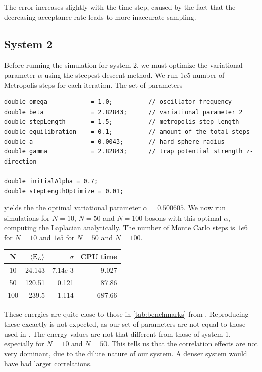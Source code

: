 \documentclass[english, a4paper]{article}
\begin{document}
\noindent The error increases slightly with the time step, caused by the fact
that the decreasing acceptance rate leads to more inaccurate sampling.  

\subsection{System 2}

Before running the simulation for system 2, we must optimize the variational parameter $\alpha$ using
the steepest descent method. We run $1e5$ number of Metropolis steps for each iteration.
The set of parameters
\belowcaptionskip=-10pt
\begin{lstlisting}[label=parameters3,caption=Parameters system 2]
double omega            = 1.0;          // oscillator frequency
double beta             = 2.82843;      // variational parameter 2
double stepLength       = 1.5;          // metropolis step length
double equilibration    = 0.1;          // amount of the total steps
double a                = 0.0043;       // hard sphere radius
double gamma            = 2.82843;      // trap potential strength z-direction

double initialAlpha = 0.7;
double stepLengthOptimize = 0.01;
\end{lstlisting}
yields the the optimal variational parameter $\alpha = 0.500605$. 
We now run simulations for $N=10$, $N=50$ and $N=100$ bosons with this optimal $\alpha$, computing
the Laplacian analytically. 
The number of Monte Carlo steps is $1e6$ for $N=10$ and $1e5$ for $N=50$ and $N=100$.
\begin{table}[H]
  \centering
  \begin{tabular}{ | c | r | r | r | }
    \hline
    N& $\langle {\textrm E_L}\rangle$& $\sigma$& CPU time \\*
    \hline
    10& 24.143& 7.14e-3& 9.027 \\*
    \hline
    50& 120.51& 0.121& 87.86  \\*
    \hline
    100& 239.5& 1.114& 687.66\\*
    \hline
  \end{tabular}
  \label{tab:Tabell1}
\end{table}
These energies are quite close to those in \ref{tab:benchmarks} from \cite{ref1}. 
Reproducing these excactly is not expected, as our set of parameters are not equal to those used in \cite{ref1}. 
The energy values are not that different from those of system 1, especially for $N=10$ and $N=50$. 
This tells us that the correlation effects are not very dominant, due to the dilute nature of our system. 
A denser system would have had larger correlations. 
\end{document}
